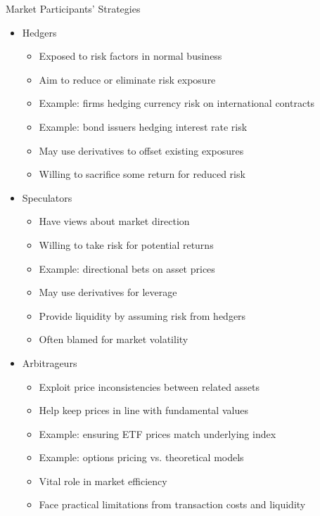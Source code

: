 \documentclass[10pt]{beamer}
\begin{document}
\begin{frame}{Market Participants' Strategies}
  \begin{itemize}[<+->]
    \item Hedgers
      \begin{itemize}
        \item Exposed to risk factors in normal business
        \item Aim to reduce or eliminate risk exposure
        \item Example: firms hedging currency risk on international contracts
        \item Example: bond issuers hedging interest rate risk
        \item May use derivatives to offset existing exposures
        \item Willing to sacrifice some return for reduced risk
      \end{itemize}
    \item Speculators
      \begin{itemize}
        \item Have views about market direction
        \item Willing to take risk for potential returns
        \item Example: directional bets on asset prices
        \item May use derivatives for leverage
        \item Provide liquidity by assuming risk from hedgers
        \item Often blamed for market volatility
      \end{itemize}
    \item Arbitrageurs
      \begin{itemize}
        \item Exploit price inconsistencies between related assets
        \item Help keep prices in line with fundamental values
        \item Example: ensuring ETF prices match underlying index
        \item Example: options pricing vs. theoretical models
        \item Vital role in market efficiency
        \item Face practical limitations from transaction costs and liquidity
      \end{itemize}
  \end{itemize}
\end{frame}
\end{document}
